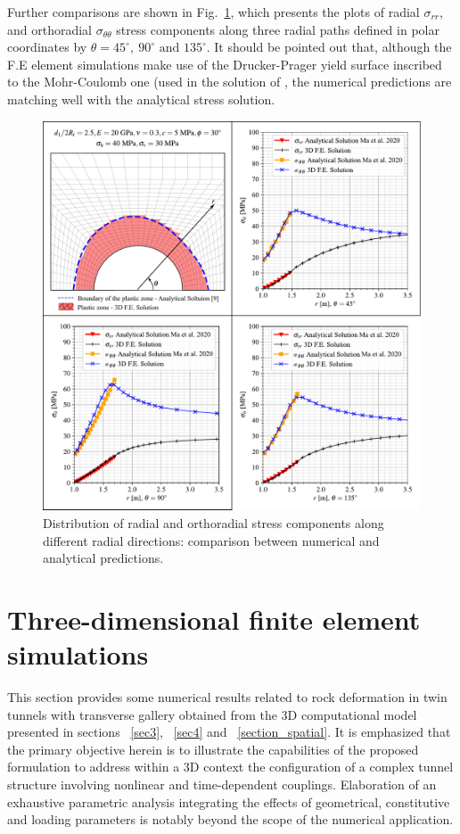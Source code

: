 \documentclass[Journal,letterpaper, NoLists,SectionNumbers]{ascelike-new}
\begin{document}
Further comparisons are shown in Fig.~\ref{MA_stresspaths}, which presents the plots of radial $\sigma_{rr}$, and orthoradial $\sigma_{\theta \theta}$ stress components along three radial paths defined in polar coordinates by $\theta = 45^\circ,~90^\circ \text{~and~} 135^\circ$. It should be pointed out that, although the F.E element simulations make use of the Drucker-Prager yield surface inscribed to the Mohr-Coulomb one (used in the solution of , the numerical predictions are matching well with the analytical stress solution.

\begin{figure}[h!]
	\centering
	\includegraphics[scale=0.6]{MA_stresspaths.pdf}
	\caption{Distribution of radial and orthoradial stress components along different radial directions: comparison between numerical and analytical predictions.}
	\label{MA_stresspaths}
\end{figure}

\section{Three-dimensional finite element simulations}\label{sec7}

This section provides some numerical results related to rock deformation in twin tunnels with transverse gallery obtained from the 3D computational model presented in sections ~\ref{sec3}, ~\ref{sec4} and ~\ref{section_spatial}. It is emphasized that the primary objective herein is to illustrate the capabilities of the proposed formulation to address within a 3D context the configuration of a complex tunnel structure involving nonlinear and time-dependent couplings.  Elaboration of an exhaustive parametric analysis integrating the effects of geometrical, constitutive and loading parameters is notably beyond the scope of the numerical application.
\end{document}
